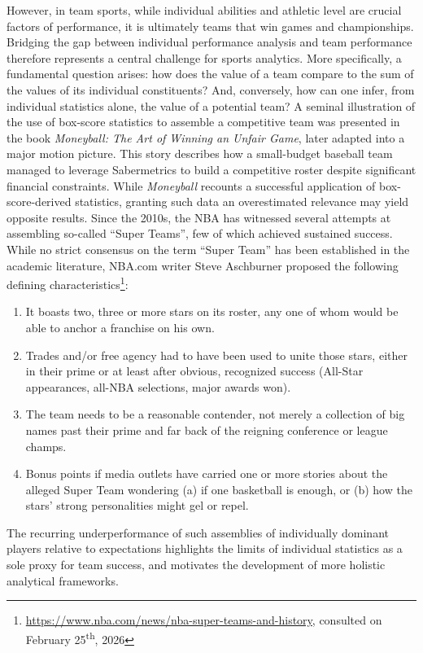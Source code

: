 However, in team sports, while individual abilities and athletic level are crucial factors of performance, it is ultimately teams that win games and championships.
Bridging the gap between individual performance analysis and team performance therefore represents a central challenge for sports analytics.
More specifically, a fundamental question arises: how does the value of a team compare to the sum of the values of its individual constituents?
And, conversely, how can one infer, from individual statistics alone, the value of a potential team?
A seminal illustration of the use of box-score statistics to assemble a competitive team was presented in the book \textit{Moneyball: The Art of Winning an Unfair Game}, later adapted into a major motion picture.
This story describes how a small-budget baseball team managed to leverage Sabermetrics to build a competitive roster despite significant financial constraints.
While \textit{Moneyball} recounts a successful application of box-score-derived statistics, granting such data an overestimated relevance may yield opposite results.
Since the 2010s, the NBA has witnessed several attempts at assembling so-called ``Super Teams'', few of which achieved sustained success.
While no strict consensus on the term ``Super Team'' has been established in the academic literature, NBA.com writer Steve Aschburner proposed the following defining characteristics\footnote{\url{https://www.nba.com/news/nba-super-teams-and-history}, consulted on February 25\textsuperscript{th}, 2026}:

\begin{enumerate}[i]
  \item It boasts two, three or more stars on its roster, any one of whom would be able to anchor a franchise on his own.
  \item Trades and/or free agency had to have been used to unite those stars, either in their prime or at least after obvious, recognized success (All-Star appearances, all-NBA selections, major awards won).
  \item The team needs to be a reasonable contender, not merely a collection of big names past their prime and far back of the reigning conference or league champs.
  \item Bonus points if media outlets have carried one or more stories about the alleged Super Team wondering (a) if one basketball is enough, or (b) how the stars’ strong personalities might gel or repel.
\end{enumerate}
The recurring underperformance of such assemblies of individually dominant players relative to expectations highlights the limits of individual statistics as a sole proxy for team success, and motivates the development of more holistic analytical frameworks. \newline

